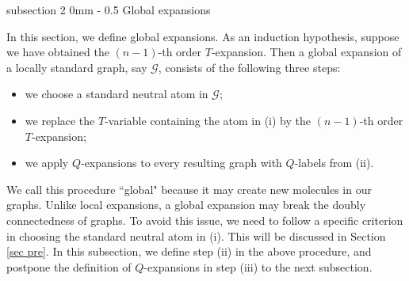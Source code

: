 \documentclass{article}
\makeatletter
\newcommand{\1}{\mathds{1}}
\numberwithin{equation}{section}
\newcommand{\al}{\alpha}
\renewcommand{\cal}{\mathcal}
\newcommand{\renormal}{\text{self-energy renormalization}}
\theoremstyle{plain} %
\theoremstyle{remark}
\renewcommand{\subsection}{\@startsection
	{subsection}%
	{2}%
	{0mm}%
	{-\baselineskip}%
	{0.5\baselineskip}%
	{\normalfont\bf\itshape}} %
\makeatother
\begin{document}
\subsection{Global expansions}\label{subsec global}

In this section, we define global expansions. As an induction hypothesis, suppose we have obtained the $(n-1)$-th order $T$-expansion.  Then a global expansion of a locally standard graph, say $\cal G$, consists of the following three steps:
\begin{itemize}
	\item[(i)] we choose a standard neutral atom in $\cal G$;
	\item[(ii)] we replace the $T$-variable containing the atom in (i) by the $(n-1)$-th order $T$-expansion;
	\item[(iii)] we apply $Q$-expansions to every resulting graph with $Q$-labels from (ii).
\end{itemize}
We call this procedure ``global" because it may create new molecules in our graphs. %
Unlike local expansions, a global expansion may break the doubly connectedness of graphs. To avoid this issue, %
we need to follow a specific criterion in choosing the standard neutral atom in (i). This will be discussed in Section \ref{sec pre}. %
In this subsection, we define step (ii) in the above procedure, and postpone the definition of $Q$-expansions in step (iii) to the next subsection. 
\end{document}

